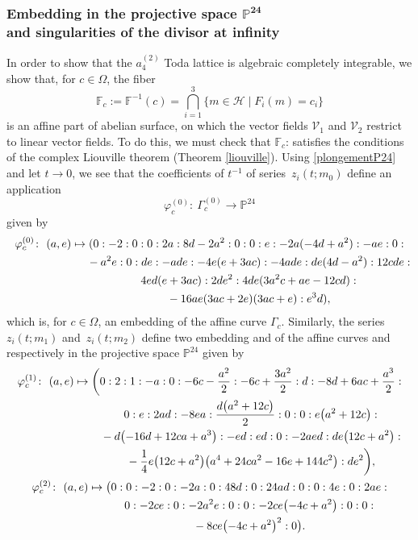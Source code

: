 \documentclass[10pt,a4paper]{amsart}
\numberwithin{equation}{section}
\begin{document}
\subsubsection[Embedding in the projective space P\^{}{24} and singularities of the divisor at infinity]{Embedding in the projective space $\boldsymbol{\mathbb{P}^{24}}$\\ and singularities of the divisor at infinity}
 In order to show that the $a_4^{(2)}$ Toda lattice is algebraic completely integrable, we show
that, for $c\in \Omega$, the fiber
 \[\mathbb{F}_c:= \mathbb{F}^{-1}(c)=\bigcap_{i=1}^3 \{m\in \mathcal{H}\mid F_i(m)=c_i\} \]
is an affine part of abelian surface, on which the vector fields
$\mathcal{V}_1$ and $\mathcal{V}_2$ restrict to linear vector
fields. To do this, we must check that $\mathbb{F}_c$: satisfies the
conditions of the complex Liouville theorem (Theorem
\eqref{liouville}).
 Using
 \eqref{plongementP24} and let $t \rightarrow 0$, we see that the coefficients of
 $t^{-1}$ of series~$z_i(t;m_0)$ define an application
 \[\varphi_c^{(0)}\colon \ \Gamma_c^{(0)}\longrightarrow \mathbb{P}^{24}\] given by
 \begin{gather}
 \varphi_c^{(0)}\colon \ (a,e) \mapsto (0:-2:0:0:2a:8d-2a^2:0:0:e:-2a(-4d+a^2):-ae:0: \nonumber\\
 \hphantom{\varphi_c^{(0)}\colon \ (a,e) \mapsto (}{} -a^2e:0:de:-ade:-4e(e+3ac):-4ade:de(4d-a^2):12cde: \nonumber\\
 \hphantom{\varphi_c^{(0)}\colon \ (a,e) \mapsto (}{} 4ed(e+3ac):2de^2:4de(3a^2c+ae-12cd): \nonumber\\
 \hphantom{\varphi_c^{(0)}\colon \ (a,e) \mapsto (}{} -16ae(3ac+2e)(3ac+e):e^3d),\label{plongementphi0}
 \end{gather}
which is, for $c\in \Omega$, an embedding of the affine curve
$\Gamma_c$. Similarly, the series~$z_i(t;m_1)$ and~$z_i(t;m_2)$ define two embedding
 and  of the
affine curves  and
 respectively in the projective space
$\mathbb{P}^{24}$ given by
 \begin{gather}
\varphi_c^{(1)}\colon \ (a,e) \mapsto \biggl(0:2:1:-a:0:-6c-\frac{a^2}{2}:-6c+\frac{3a^2}{2}:d:-8d+6ac+\frac{a^3}{2}: \nonumber\\
 \hphantom{\varphi_c^{(1)}\colon \ (a,e) \mapsto\biggl(}{}
 0:e:2ad:-8ea:\frac{d\bigl(a^2+12c\bigr)}{2}:0:0:e\bigl(a^2+12c\bigr): \nonumber\\
 \hphantom{\varphi_c^{(1)}\colon \ (a,e) \mapsto\biggl(}{}
 -d\bigl(-16d+12ca+a^3\bigr):-ed:ed:0:-2aed:de\bigl(12c+a^2\bigr): \nonumber\\
 \hphantom{\varphi_c^{(1)}\colon \ (a,e) \mapsto\biggl(}{}
 -\frac{1}{4}e\bigl(12c+a^2\bigr)\bigl(a^4+24ca^2-16e+144c^2\bigr):de^2\biggr),\label{plongementphi1}\\
\varphi_c^{(2)}\colon \ (a,e) \mapsto \bigl(0:0:-2: 0:-2a:0:48d:0:24ad:0:0:4e:0:2ae: \nonumber\\
 \hphantom{\varphi_c^{(2)}\colon \ (a,e) \mapsto\bigl(}{}
 0:-2ce:0:-2a^2e:0:0:-2ce\bigl(-4c+a^2\bigr):0:0: \nonumber\\
 \hphantom{\varphi_c^{(2)}\colon \ (a,e) \mapsto\bigl(}{}
 -8ce\bigl(-4c+a^2\bigr)^2:0\bigr). \label{plongementphi2}
\end{gather}
\end{document}
